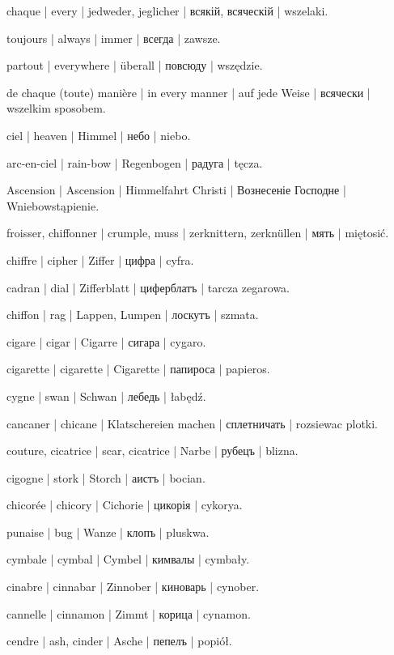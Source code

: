 \begin{outdent}{1em}
chaque | every | jedweder, jeglicher | всякій, всяческій | wszelaki.

toujours | always | immer | всегда | zawsze.

partout | everywhere | überall | повсюду | wszędzie.

de chaque (toute) manière | in every manner | auf jede Weise | всячески | wszelkim sposobem.

ciel | heaven | Himmel | небо | niebo.

\uvsubentry{}
arc-en-ciel | rain-bow | Regenbogen | радуга | tęcza.


\uvsubentry{}
Ascension | Ascension | Himmelfahrt Christi | Вознесеніе Господне | Wniebowstąpienie.

froisser, chiffonner | crumple, muss | zerknittern, zerknüllen | мять | miętosić.

chiffre | cipher | Ziffer | цифра | cyfra.

\uvsubentry{}
cadran | dial | Zifferblatt | циферблатъ | tarcza zegarowa.

chiffon | rag | Lappen, Lumpen | лоскутъ | szmata.

cigare | cigar | Cigarre | сигара | cygaro.

cigarette | cigarette | Cigarette | папироса | papieros.

cygne | swan | Schwan | лебедь | łabędź.

cancaner | chicane | Klatschereien machen | сплетничать | rozsiewac plotki.

couture, cicatrice | scar, cicatrice | Narbe | рубецъ | blizna.

cigogne | stork | Storch | аистъ | bocian.

chicorée | chicory | Cichorie | цикорія | cykorya.

punaise | bug | Wanze | клопъ | pluskwa.

cymbale | cymbal | Cymbel | кимвалы | cymbały.

cinabre | cinnabar | Zinnober | киноварь | cynober.

cannelle | cinnamon | Zimmt | корица | cynamon.

cendre | ash, cinder | Asche | пепелъ | popiół.


\end{outdent}
